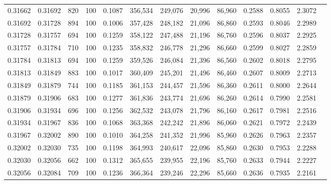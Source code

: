 \begin{tabular}{rrrrrrrrrrrrr}
0.31662 & 0.31692 &    820 & 100 &                                     0.1087 & 356,534 & 249,076 &  20,996 &  86,960 & 0.2588 & 0.8055 & 2.3072 \\
0.31692 & 0.31728 &    894 & 100 &                                     0.1006 & 357,428 & 248,182 &  21,096 &  86,860 & 0.2593 & 0.8046 & 2.2989 \\
0.31728 & 0.31757 &    694 & 100 &                                     0.1259 & 358,122 & 247,488 &  21,196 &  86,760 & 0.2596 & 0.8037 & 2.2925 \\
0.31757 & 0.31784 &    710 & 100 &                                     0.1235 & 358,832 & 246,778 &  21,296 &  86,660 & 0.2599 & 0.8027 & 2.2859 \\
0.31784 & 0.31813 &    694 & 100 &                                     0.1259 & 359,526 & 246,084 &  21,396 &  86,560 & 0.2602 & 0.8018 & 2.2795 \\
0.31813 & 0.31849 &    883 & 100 &                                     0.1017 & 360,409 & 245,201 &  21,496 &  86,460 & 0.2607 & 0.8009 & 2.2713 \\
0.31849 & 0.31879 &    744 & 100 &                                     0.1185 & 361,153 & 244,457 &  21,596 &  86,360 & 0.2611 & 0.8000 & 2.2644 \\
0.31879 & 0.31906 &    683 & 100 &                                     0.1277 & 361,836 & 243,774 &  21,696 &  86,260 & 0.2614 & 0.7990 & 2.2581 \\
0.31906 & 0.31934 &    696 & 100 &                                     0.1256 & 362,532 & 243,078 &  21,796 &  86,160 & 0.2617 & 0.7981 & 2.2516 \\
0.31934 & 0.31967 &    836 & 100 &                                     0.1068 & 363,368 & 242,242 &  21,896 &  86,060 & 0.2621 & 0.7972 & 2.2439 \\
0.31967 & 0.32002 &    890 & 100 &                                     0.1010 & 364,258 & 241,352 &  21,996 &  85,960 & 0.2626 & 0.7963 & 2.2357 \\
0.32002 & 0.32030 &    735 & 100 &                                     0.1198 & 364,993 & 240,617 &  22,096 &  85,860 & 0.2630 & 0.7953 & 2.2288 \\
0.32030 & 0.32056 &    662 & 100 &                                     0.1312 & 365,655 & 239,955 &  22,196 &  85,760 & 0.2633 & 0.7944 & 2.2227 \\
0.32056 & 0.32084 &    709 & 100 &                                     0.1236 & 366,364 & 239,246 &  22,296 &  85,660 & 0.2636 & 0.7935 & 2.2161 \\

\end{tabular}
